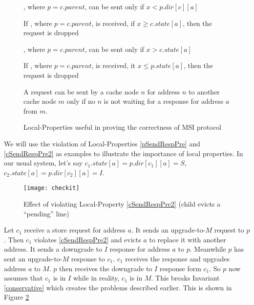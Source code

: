 \begin{figure}
%
\begin{inv}
, where $p = c.parent$, can be sent only if $x < p.dir[c][a]$\label{pSendReqPre}
\end{inv}
\begin{inv}
If , where $p = c.parent$, is received, if $x \ge c.state[a]$,
then the request is dropped\label{pSendReqPost}
\end{inv}
\begin{inv}
, where $p = c.parent$, can be sent only if $x > c.state[a]$\label{cSendReqPre}
\end{inv}
\begin{inv}
If , where $p = c.parent$, is received, it $x \le p.state[a]$,
then the request is dropped\label{cSendReqPost}
\end{inv}
\begin{inv}
A request can be sent by a cache node $n$ for address $n$ to another cache node $m$ only if
no $n$ is not waiting for a response for address $a$ from $m$.
\label{nodoublereq}
\end{inv}
\caption{Local-Properties useful in proving the correctness of MSI protocol}
\label{sendReq}
\end{figure}

 We will use the violation of Local-Properties \ref{pSendRespPre} and
\ref{cSendRespPre2} as examples to illustrate the importance of local
properties.  In our usual system, let's say $c_1.state[a] = p.dir[c_1][a] = S$,
$c_2.state[a] = p.dir[c_2][a] = I$.

\begin{figure}
\centering
\texttt{[image: checkit]}
\caption{Effect of violating Local-Property \ref{cSendRespPre2} (child evicts a ``pending'' line)}
\label{checkit}
\end{figure}

Let $c_1$ receive a store request for address $a$. It sends an upgrade-to-$M$
request to $p$. Then $c_1$ violates \ref{cSendRespPre2} and evicts $a$ to
replace it with another address. It sends a downgrade to $I$ response for
address $a$ to $p$.  Meanwhile $p$ has sent an upgrade-to-$M$ response to
$c_1$. $c_1$ receives the response and upgrades address $a$ to $M$. $p$ then
receives the downgrade to $I$ response form $c_1$. So $p$ now assumes that
$c_1$ is in $I$ while in reality, $c_1$ is in $M$. This breaks Invariant
\ref{conservative} which creates the problems described earlier. This is shown
in Figure \ref{checkit}

